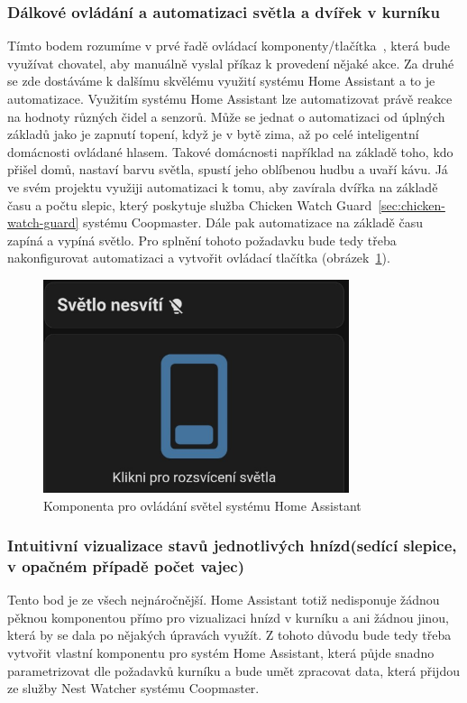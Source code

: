 \subsubsection*{Dálkové ovládání a automatizaci světla a dvířek v kurníku}
Tímto bodem rozumíme v prvé řadě ovládací komponenty/tlačítka~\cite{HomeAssistantButtonCard}, která bude využívat chovatel, aby manuálně vyslal příkaz k provedení nějaké akce.
Za druhé se zde dostáváme k dalšímu skvělému využití systému Home Assistant a to je automatizace.
Využitím systému Home Assistant lze automatizovat právě reakce na hodnoty různých čidel a senzorů.
Může se jednat o automatizaci od úplných základů jako je zapnutí topení, když je v bytě zima, až po celé inteligentní domácnosti ovládané hlasem.
Takové domácnosti například na základě toho, kdo přišel domů, nastaví barvu světla, spustí jeho oblíbenou hudbu a uvaří kávu.
Já ve svém projektu využiji automatizaci k tomu, aby zavírala dvířka na základě času a počtu slepic, který poskytuje služba Chicken Watch Guard~\ref{sec:chicken-watch-guard} systému Coopmaster.
Dále pak automatizace na základě času zapíná a vypíná světlo.\newline
Pro splnění tohoto požadavku bude tedy třeba nakonfigurovat automatizaci a vytvořit ovládací tlačítka (obrázek~\ref{fig:homeassitant_lamp_button}).

\begin{figure}[H]
    \centering
    \includegraphics[width=0.8\textwidth]{img/homeasistant_lamp_button}
    \caption{Komponenta pro ovládání světel systému Home Assistant}
    \label{fig:homeassitant_lamp_button}
\end{figure}

\subsubsection*{Intuitivní vizualizace stavů jednotlivých hnízd(sedící slepice, v opačném případě počet vajec)}
Tento bod je ze všech nejnáročnější.
Home Assistant totiž nedisponuje žádnou pěknou komponentou přímo pro vizualizaci hnízd v kurníku a ani žádnou jinou, která by se dala po nějakých úpravách využít.\newline
Z tohoto důvodu bude tedy třeba vytvořit vlastní komponentu pro systém Home Assistant, která půjde snadno parametrizovat dle požadavků kurníku a bude umět zpracovat data, která přijdou ze služby Nest Watcher systému Coopmaster.

